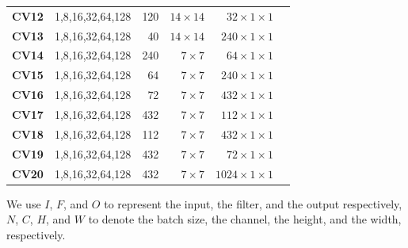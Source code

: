 \begin{table}[]
\begin{threeparttable}
\begin{tabular}{lrrrrr}
\textbf{CV12} & 1,8,16,32,64,128  & 120   & $14\times 14$   & $32 \times 1\times 1$\\
\textbf{CV13} & 1,8,16,32,64,128  & 40    & $14\times 14$   & $240 \times 1\times 1$\\
\textbf{CV14} & 1,8,16,32,64,128  & 240   & $7\times 7$     & $64  \times 1\times 1$\\
\textbf{CV15} & 1,8,16,32,64,128  & 64    & $7\times 7$     & $240 \times 1\times 1$\\
\textbf{CV16} & 1,8,16,32,64,128  & 72    & $7\times 7$     & $432 \times 1\times 1$\\
\textbf{CV17} & 1,8,16,32,64,128  & 432   & $7\times 7$     & $112 \times 1\times 1$\\
\textbf{CV18} & 1,8,16,32,64,128  & 112   & $7\times 7$     & $432 \times 1\times 1$\\
\textbf{CV19} & 1,8,16,32,64,128  & 432   & $7\times 7$     & $72 \times 1\times 1$\\
\textbf{CV20} & 1,8,16,32,64,128  & 432   & $7\times 7$     & $1024 \times 1\times 1$\\

\bottomrule
\end{tabular}
\begin{tablenotes}
\item[\dag] We use $I$, $F$, and $O$ to represent the input, the filter, and the output respectively, $N$, $C$, $H$, and $W$
to denote the batch size, the channel, the height, and the width, respectively.
\end{tablenotes}
\end{threeparttable}
\end{table}


